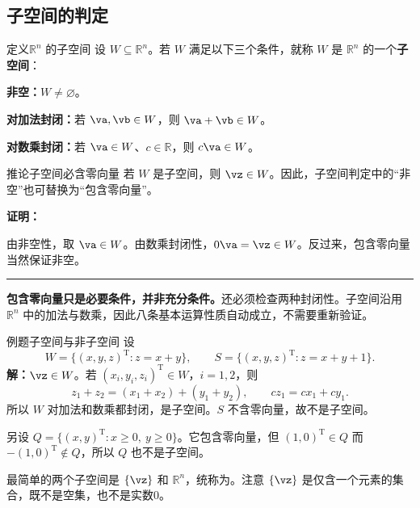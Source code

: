 \documentclass[a4paper,12pt,twoside,openany,fontset=none]{ctexbook}
\renewcommand{\ge}{\geqslant}
\newenvironment{corollary}[1][]{\begin{thmBox}{推论}{#1}}{\end{thmBox}}
\newcounter{definition}[chapter]
\newenvironment{definition}[1][]{\begin{defBox}{定义}{#1}}{\end{defBox}}
\newcounter{example}[chapter]
\newenvironment{example}[1][]{\begin{exBox}{例题}{#1}}{\end{exBox}}
\renewenvironment{proof}{
    \par\vspace{0.5em}\noindent
    \textbf{\color{LogicColor} 证明：}
}{
    \hfill \textcolor{LogicColor}{\rule{0.6em}{0.6em}} \par
}
\numberwithin{equation}{chapter}
\begin{document}
\subsection*{子空间的判定}

\begin{definition}[$\mathbb{R}^n$ 的子空间]
设 $W\subseteq\mathbb{R}^n$。若 $W$ 满足以下三个条件，就称 $W$ 是 $\mathbb{R}^n$ 的一个\textbf{子空间}：

\textbf{非空：}$W\ne\varnothing$。

\textbf{对加法封闭：}若 $\va,\vb\in W$，则 $\va+\vb\in W$。

\textbf{对数乘封闭：}若 $\va\in W$、$c\in\mathbb{R}$，则 $c\va\in W$。
\end{definition}

\begin{corollary}[子空间必含零向量]
若 $W$ 是子空间，则 $\vz\in W$。因此，子空间判定中的“非空”也可替换为“包含零向量”。
\end{corollary}

\begin{proof}
由非空性，取 $\va\in W$。由数乘封闭性，$0\va=\vz\in W$。反过来，包含零向量当然保证非空。
\end{proof}

\textbf{包含零向量只是必要条件，并非充分条件。}还必须检查两种封闭性。子空间沿用 $\mathbb{R}^n$ 中的加法与数乘，因此八条基本运算性质自动成立，不需要重新验证。

\begin{example}[子空间与非子空间]
设
\[
    W=\{(x,y,z)^{\mathrm T}:z=x+y\},\qquad
    S=\{(x,y,z)^{\mathrm T}:z=x+y+1\}.
\]
\textbf{解：}$\vz\in W$。若 $(x_i,y_i,z_i)^{\mathrm T}\in W$，$i=1,2$，则
\[
    z_1+z_2=(x_1+x_2)+(y_1+y_2),\qquad
    cz_1=cx_1+cy_1.
\]
所以 $W$ 对加法和数乘都封闭，是子空间。$S$ 不含零向量，故不是子空间。

另设 $Q=\{(x,y)^{\mathrm T}:x\ge0,\ y\ge0\}$。它包含零向量，但 $(1,0)^{\mathrm T}\in Q$ 而 $-(1,0)^{\mathrm T}\notin Q$，所以 $Q$ 也不是子空间。
\end{example}

最简单的两个子空间是\textbf{} $\{\vz\}$ 和\textbf{} $\mathbb{R}^n$，统称为。注意 $\{\vz\}$ 是仅含一个元素的集合，既不是空集，也不是实数0。
\end{document}
